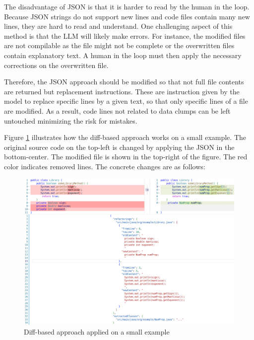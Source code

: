 The disadvantage of \ac{JSON} is that it is harder to read by the human in the loop. Because JSON strings do not support new lines and code files contain many new lines, they are hard to read and understand.
One challenging aspect of this method is that the \ac{LLM} will likely make errors. For instance, the modified files are not compilable as the file might not be complete or the  overwritten files contain explanatory text. A human in the loop must then apply the necessary corrections on the overwritten file.



Therefore, the \ac{JSON} approach should be modified so that not full file contents are returned but replacement instructions. These are instruction given by the model to replace specific lines by a given text, so that only specific lines of a file are modified.  As a result, code lines not related to data clumps can be left untouched minimizing the risk for mistakes. 


Figure \ref{fig:json_based_changes} illustrates how the diff-based approach works on a small example. The original source code on the top-left is changed by applying the JSON in the bottom-center. The modified file is shown in the top-right of the figure. The red color indicates removed lines. The concrete changes are as follows:
\begin{figure}
    \centering
    \includegraphics[width=\columnwidth]{figures/chapter4/diff_original_changed_vscode_cmp.png}
    \caption{Diff-based approach applied on a small example}
    \label{fig:json_based_changes}
\end{figure}


